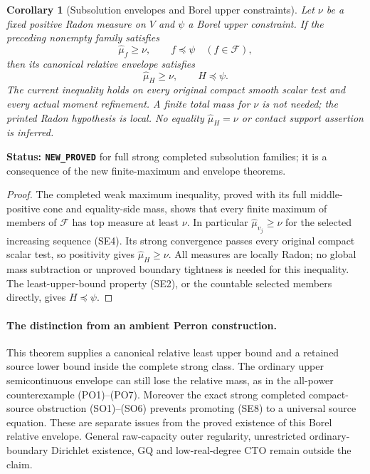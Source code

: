 \documentclass[11pt,a4paper]{article}
\numberwithin{equation}{section}
\newtheorem{corollary}[theorem]{Corollary}
\theoremstyle{definition}
\theoremstyle{remark}
\begin{document}
\begin{corollary}[Subsolution envelopes and Borel upper constraints]
\label{cor:r11-strong-Perron-subsolution}
Let $\nu$ be a fixed positive Radon measure on $V$ and
$\psi$ a Borel upper constraint. If the preceding nonempty
family satisfies
\[
                    \widehat\mu_f\geq\nu,
                    \qquad f\preceq\psi
                                  \quad(f\in\mathscr F),
 \tag{SE7}
\]
then its canonical relative envelope satisfies
\[
                             \widehat\mu_H\geq\nu,
                             \qquad H\preceq\psi.
 \tag{SE8}
\]
The current inequality holds on every original compact smooth
scalar test and every actual moment refinement. A finite total
mass for $\nu$ is not needed; the printed Radon hypothesis is
local. No equality $\widehat\mu_H=\nu$ or contact support
assertion is inferred.
\end{corollary}

\noindent\textbf{Status: \texttt{NEW\_PROVED}} for full strong
completed subsolution families; it is a consequence of the
new finite-maximum and envelope theorems.

\begin{proof}
The completed weak maximum inequality, proved with its full
middle-positive cone and equality-side mass, shows that every
finite maximum of members of $\mathscr F$ has top measure at
least $\nu$. In particular $\widehat\mu_{v_j}\geq\nu$ for
the selected increasing sequence (SE4).
Its strong convergence passes every original compact scalar
test, so positivity gives $\widehat\mu_H\geq\nu$.
All measures are locally Radon; no global mass subtraction
or unproved boundary tightness is needed for this inequality.
The least-upper-bound property (SE2), or the countable selected
members directly, gives $H\preceq\psi$.
\end{proof}

\paragraph{The distinction from an ambient Perron construction.}
This theorem supplies a canonical relative least upper bound
and a retained source lower bound inside the complete strong
class. The ordinary upper semicontinuous envelope can still
lose the relative mass, as in the all-power counterexample
(PO1)--(PO7). Moreover the exact strong completed compact-source
obstruction (SO1)--(SO6) prevents promoting (SE8) to a universal
source equation. These are separate issues from the proved
existence of this Borel relative envelope. General raw-capacity
outer regularity, unrestricted ordinary-boundary Dirichlet
existence, GQ and low-real-degree CTO remain outside the claim.
\end{document}
